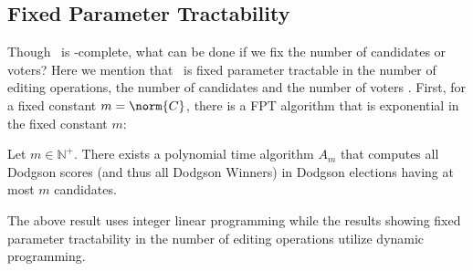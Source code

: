 
\subsection{Fixed Parameter Tractability}\label{subsec:fpt}

Though \dwin~is \tp-complete, what can be done if we
fix the number of candidates or voters?
Here we mention that \dwin~is fixed parameter tractable
in the number of editing operations, the number of
candidates
and the number of voters \citep{bartholdiVoting}.
First, for a fixed constant $m = \norm{C}$, there is a
FPT algorithm that is exponential in the fixed constant $m$:

\begin{proposition}{\citep{bartholdiVoting}}
    Let $m \in \mathbb{N}^+$.
    There exists a polynomial time algorithm $A_m$ that
    computes all Dodgson scores (and thus all Dodgson Winners)
    in Dodgson elections having at most $m$ candidates.
\end{proposition}

The above result uses integer linear programming while the results
showing fixed parameter tractability in the number of
editing operations utilize dynamic programming.

